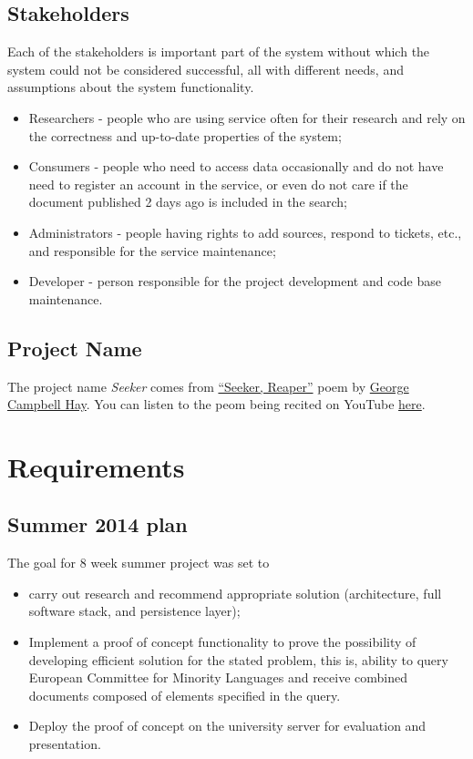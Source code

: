 \documentclass[a4paper]{tufte-book}
\begin{document}
\section{Stakeholders}

Each of the stakeholders is important part of the system without which the system could not be considered successful, all with different needs, and assumptions about the system functionality.

\begin{itemize}
  \item Researchers - people who are using service often for their research and rely on the correctness and up-to-date properties of the system;
  \item Consumers - people who need to access data occasionally and do not have need to register an account in the service, or even do not care if the document published 2 days ago is included in the search;
  \item Administrators - people having rights to add sources, respond to tickets, etc., and responsible for the service maintenance;
  \item Developer - person responsible for the project development and code base maintenance.
\end{itemize}

\section{Project Name}
The project name \emph{Seeker} comes from \href{http://www.scottishpoetrylibrary.org.uk/poetry/poems/seeker-reaper}{``Seeker, Reaper''} poem by \href{http://en.wikipedia.org/wiki/George_Campbell_Hay}{George Campbell Hay}. You can listen to the peom being recited on YouTube \href{https://www.youtube.com/watch?v=gjxPtRZFF24}{here}.



\chapter{Requirements}

\section{Summer 2014 plan}
The goal for 8 week summer project was set to
\begin{itemize}
  \item carry out research and recommend appropriate solution (architecture, full software stack, and persistence layer);
  \item Implement a proof of concept functionality to prove the possibility of developing efficient solution for the stated problem, this is, ability to query European Committee for Minority Languages and receive combined documents composed of elements specified in the query.
  \item Deploy the proof of concept on the university server for evaluation and presentation.
\end{itemize}
\end{document}
